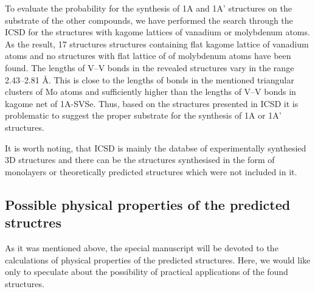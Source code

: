 \documentclass[a4paperm]{article}
\begin{document}
To evaluate the probability for the synthesis of 1A and 1A' structures on the substrate of the other compounds, we have performed the search through the ICSD for the structures with kagome lattices of vanadium or molybdenum atoms.
As the result, 17 structures structures containing flat kagome lattice of vanadium atoms and no structures with flat lattice of of molybdenum atoms have been found. 
The lengths of V--V bonds in the revealed structures vary in the range 2.43--2.81 \AA.
This is close to the lengths of bonds in the mentioned triangular clusters of Mo atoms and sufficiently higher than the lengths of V--V bonds in kagome net of 1A-SVSe.
Thus, based on the structures presented in ICSD it is problematic to suggest the proper substrate for the synthesis of 1A or 1A' structures.




It is worth noting, that ICSD is mainly the databse of experimentally synthesied 3D structures and there can be the structures synthesised in the form of monolayers or theoretically predicted structures which were not included in it.



\subsection{Possible physical properties of the predicted structres}

As it was mentioned above, the special manuscript will be devoted to the calculations of physical properties of the predicted structures.
Here, we would like only to speculate about the possibility of practical applications of the found structures.
\end{document}
